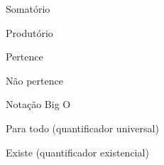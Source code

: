 
\begin{simbolos}
    \item[$ \Sigma $]   Somatório
    \item[$ \prod $]    Produtório
    \item[$ \in $]      Pertence
    \item[$ \notin $]   Não pertence
    \item[$ \mathcal{O}(n) $] Notação Big O
    \item[$ \forall $]  Para todo (quantificador universal)
    \item[$ \exists $]  Existe (quantificador existencial)
\end{simbolos}

